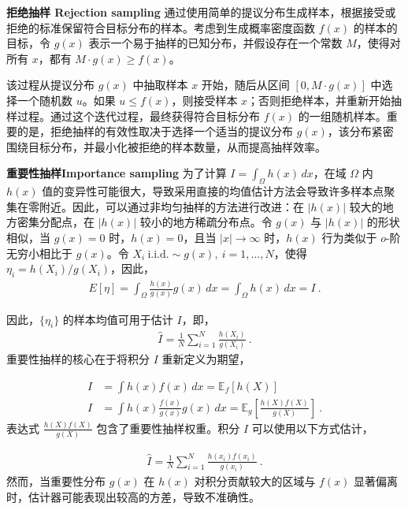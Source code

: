 \textbf{拒绝抽样 Rejection sampling }通过使用简单的提议分布生成样本，根据接受或拒绝的标准保留符合目标分布的样本。考虑到生成概率密度函数 \(f(x)\) 的样本的目标，令 \(g(x)\) 表示一个易于抽样的已知分布，并假设存在一个常数 \(M\)，使得对所有 \(x\)，都有 \(M \cdot g(x) \geq f(x)\)。

该过程从提议分布 \(g(x)\) 中抽取样本 \(x\) 开始，随后从区间 \([0, M \cdot g(x)]\) 中选择一个随机数 \(u\)。如果 \(u \leq f(x)\)，则接受样本 \(x\)；否则拒绝样本，并重新开始抽样过程。通过这个迭代过程，最终获得符合目标分布 \(f(x)\) 的一组随机样本。重要的是，拒绝抽样的有效性取决于选择一个适当的提议分布 \(g(x)\)，该分布紧密围绕目标分布，并最小化被拒绝的样本数量，从而提高抽样效率。

\textbf{重要性抽样Importance sampling } 为了计算 \(I = \int_\Omega h(x) \,dx\)，在域 \(\Omega\) 内 \(h(x)\) 值的变异性可能很大，导致采用直接的均值估计方法会导致许多样本点聚集在零附近。因此，可以通过非均匀抽样的方法进行改进：在 \(|h(x)|\) 较大的地方密集分配点，在 \(|h(x)|\) 较小的地方稀疏分布点。令 \(g(x)\) 与 \(|h(x)|\) 的形状相似，当 \(g(x) = 0\) 时，\(h(x) = 0\)，且当 \(|x| \to \infty\) 时，\(h(x)\) 行为类似于 \(o\)-阶无穷小相比于 \(g(x)\)。令 \( X_i \ \text{i.i.d.}  \sim g(x), \ i=1,\ldots,N \)，使得 $\eta_i = h(X_i)/g(X_i)$，因此，
\begin{align}
    E[\eta] = \int_\Omega \frac{h(x)}{g(x)} g(x) \,d x = \int_\Omega h( x) \,d  x = I~.
\end{align}

因此，$\{\eta_i\}$ 的样本均值可用于估计 $I$，即，
\begin{align}
    \hat I  = \frac{1}{N} \sum_{i=1}^N \frac{h(X_i)}{g(X_i)}~.
\end{align}
重要性抽样的核心在于将积分 \(I\) 重新定义为期望，

\begin{align}
    I &= \int h(x) f(x) \, dx = \mathbb{E}_{f}[h(X)]\\
    I &= \int h(x) \frac{f(x)}{g(x)} g(x) \, dx = \mathbb{E}_{g}\left[\frac{h(X)f(X)}{g(X)}\right]~.
\end{align}
表达式 \(\frac{h(X)f(X)}{g(X)}\) 包含了重要性抽样权重。积分 \(I\) 可以使用以下方式估计，

\begin{align}
    \hat I  = \frac{1}{N} \sum_{i=1}^{N} \frac{h(x_i)f(x_i)}{g(x_i)}~.
\end{align}
然而，当重要性分布 \(g(x)\) 在 \(h(x)\) 对积分贡献较大的区域与 \(f(x)\) 显著偏离时，估计器可能表现出较高的方差，导致不准确性。

